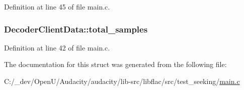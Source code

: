 Definition at line 45 of file main.\+c.

\subsubsection[{\texorpdfstring{total\+\_\+samples}{total_samples}}]{ Decoder\+Client\+Data\+::total\+\_\+samples}\hypertarget{struct_decoder_client_data_a2668fbf4f29f34cf1ca74abfe0454b37}{}\label{struct_decoder_client_data_a2668fbf4f29f34cf1ca74abfe0454b37}


Definition at line 42 of file main.\+c.



The documentation for this struct was generated from the following file\+:\begin{DoxyCompactItemize}
\item 
C\+:/\+\_\+dev/\+Open\+U/\+Audacity/audacity/lib-\/src/libflac/src/test\+\_\+seeking/\hyperlink{src_2test__seeking_2main_8c}{main.\+c}\end{DoxyCompactItemize}
